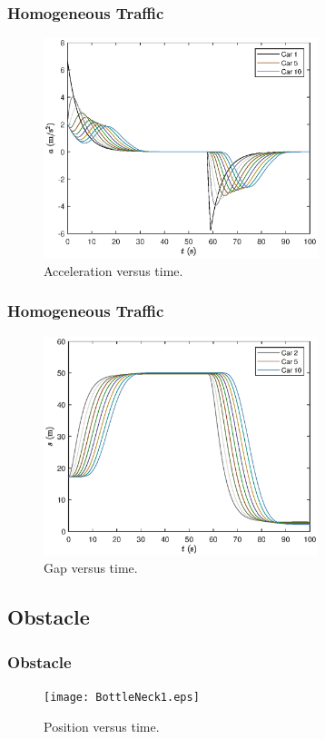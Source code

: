 \documentclass{beamer}
\begin{document}
\begin{frame}
  \frametitle{Homogeneous Traffic}
  \begin{figure}[H]
    \includegraphics[width=8cm]{HomogeneousTraffic3.eps}
    \caption{Acceleration versus time.}
\end{figure}
\end{frame}

\begin{frame}
  \frametitle{Homogeneous Traffic}
  \begin{figure}[H]
    \includegraphics[width=8cm]{HomogeneousTraffic4.eps}
    \caption{Gap versus time.}
\end{figure}
\end{frame}

\subsection{Obstacle}

\begin{frame}
  \frametitle{Obstacle}
  \begin{figure}[H]
    \texttt{[image: BottleNeck1.eps]}
    \caption{Position versus time.} 
\end{figure}
\end{frame}
\end{document}
